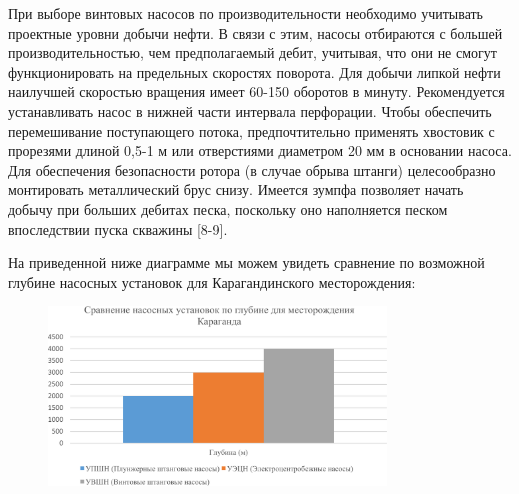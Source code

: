 \begin{multicols}{2}
При выборе винтовых насосов по производительности необходимо учитывать
проектные уровни добычи нефти. В связи с этим, насосы отбираются с
большей производительностью, чем предполагаемый дебит, учитывая, что они
не смогут функционировать на предельных скоростях поворота. Для добычи
липкой нефти наилучшей скоростью вращения имеет 60-150 оборотов в
минуту. Рекомендуется устанавливать насос в нижней части интервала
перфорации. Чтобы обеспечить перемешивание поступающего потока,
предпочтительно применять хвостовик с прорезями длиной 0,5-1 м или
отверстиями диаметром 20 мм в основании насоса. Для обеспечения
безопасности ротора (в случае обрыва штанги) целесообразно монтировать
металлический брус снизу. Имеется зумпфа позволяет начать добычу при
больших дебитах песка, поскольку оно наполняется песком впоследствии
пуска скважины {[}8-9{]}.

На приведенной ниже диаграмме мы можем увидеть сравнение по возможной
глубине насосных установок для Карагандинского месторождения:
\end{multicols}

\begin{figure}[H]
	\centering
	\includegraphics[width=0.8\textwidth]{media/gorn4/image1}
\end{figure}

